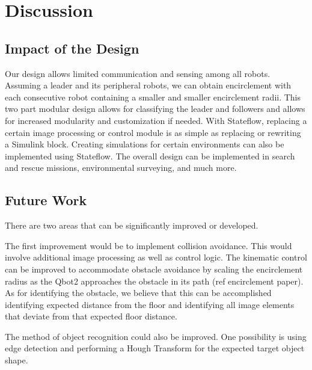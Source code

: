 \chapter{Discussion}

\section{Impact of the Design}
Our design allows limited communication and sensing among all robots. Assuming a leader and its peripheral robots, we can obtain encirclement with each consecutive robot containing a smaller and smaller encirclement radii. This two part modular design allows for classifying the leader and followers and allows for increased modularity and customization if needed. With Stateflow, replacing a certain image processing or control module is as simple as replacing or rewriting a Simulink block. Creating simulations for certain environments can also be implemented using Stateflow.
The overall design can be implemented in search and rescue missions, environmental surveying, and much more.

\section{Future Work}
There are two areas that can be significantly improved or developed.

The first improvement would be to implement collision avoidance.  This would involve additional image processing as well as control logic.  The kinematic control can be improved to accommodate obstacle avoidance by scaling the encirclement radius as the Qbot2 approaches the obstacle in its path (ref encirclement paper).  As for identifying the obstacle, we believe that this can be accomplished identifying expected distance from the floor and identifying all image elements that deviate from that expected floor distance.  

The method of object recognition could also be improved. One possibility is using edge detection and performing a Hough Transform for the expected target object shape.